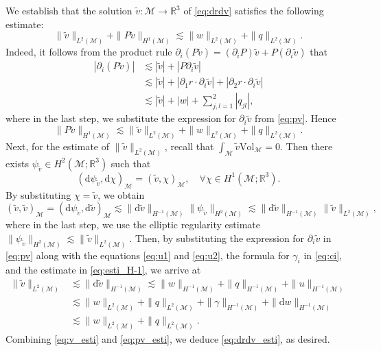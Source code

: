 \documentclass[11pt,a4paper,oneside,reqno]{amsart}
\theoremstyle{definition}
\theoremstyle{plain}
\numberwithin{theorem}{section}
\numberwithin{proposition}{section}
\numberwithin{lemma}{section}
\numberwithin{equation}{section}
\newcommand{\Man}{\mathcal{M}}
\newcommand{\Vol}{\mathrm{Vol}}
\begin{document}
We establish that the solution $\tilde{v} : \Man \rightarrow \mathbb{R}^3$ of \eqref{eq:drdv} 
satisfies the following estimate:
\begin{equation}\label{eq:drdv_esti}
\|\tilde{v}\|_{L^2(\Man)} + \|P\tilde{v}\|_{H^1(\Man)}
\lesssim \|w\|_{L^2(\Man)} + \|q\|_{L^2(\Man)}.
\end{equation}
Indeed, it follows from the product rule 
$\partial_i(P \tilde v) = (\partial_i P) \tilde  v + P (\partial_i\tilde  v)$ that 
\[ \begin{aligned}
    | \partial_i(P \tilde v) | &\lesssim |\tilde v| + |P \partial_i \tilde v| \\ 
    & \lesssim  |\tilde v| + |\partial_1 r \cdot \partial_i \tilde v|
    + |\partial_2 r \cdot \partial_i \tilde v| \\ 
    & \lesssim  |\tilde v| + |w| + \sum_{j,l = 1}^2 |q_{jl}|, 
\end{aligned} \]
where in the last step, we substitute the expression for $\partial_i \tilde v$ from \eqref{eq:pv}. Hence 
\begin{equation}\label{eq:pv_esti} 
\|P \tilde  v\|_{H^1(\Man)} \lesssim 
\| \tilde  v \|_{L^2(\Man)} + \| w \|_{L^2(\Man)} + \|q\|_{L^2(\Man)}.
\end{equation} 
Next, for the estimate of $\|\tilde v\|_{L^2(\Man)}$, recall that $\int_{\Man} \tilde  v \Vol_{\Man} = 0$. Then there exists $\psi_{\tilde v} \in H^2(\Man; \mathbb{R}^3)$ such that 
\[ (\mathrm{d} \psi_{\tilde v}, \mathrm{d} \chi)_{\Man} = (\tilde v, \chi)_\Man, \quad \forall \chi \in H^1(\Man; \mathbb{R}^3). \]
By substituting $\chi = \tilde  v$, we obtain 
\[ (\tilde v, \tilde v)_{\Man} = (\mathrm{d} \psi_{\tilde v}, \mathrm{d} \tilde v)_{\Man}
\lesssim \| \mathrm{d} \tilde v \|_{H^{-1}(\Man)} \|\psi_{\tilde v}\|_{H^2(\Man)}
\lesssim \| \mathrm{d} \tilde v \|_{H^{-1}(\Man)} \| \tilde v \|_{L^2(\Man)}, 
\]
where in the last step, we use the elliptic regularity estimate $ \|\psi_{\tilde v}\|_{H^2(\Man)} \lesssim \| \tilde v \|_{L^2(\Man)}$. 
Then, by substituting the expression for \( \partial_i \tilde v \) in \eqref{eq:pv} along with the equations \eqref{eq:u1} and \eqref{eq:u2}, the formula for \( \gamma_i \) in \eqref{eq:ci}, and the estimate in \eqref{eq:esti_H-1}, we arrive at
\begin{equation}\label{eq:v_esti} 
\begin{aligned}
    \|\tilde  v\|_{L^2(\Man)} &\lesssim \| \mathrm{d} \tilde v \|_{H^{-1}(\Man)} 
\lesssim \| w \|_{H^{-1}(\Man)} + \|q\|_{H^{-1}(\Man)} + \|u\|_{H^{-1}(\Man)} \\ 
& \lesssim \| w \|_{L^2(\Man)} + \|q\|_{L^2(\Man)} + \| \gamma\|_{H^{-1}(\Man)} 
+ \|\mathrm{d} w\|_{H^{-1}(\Man)} \\ 
& \lesssim \| w \|_{L^2(\Man)} + \|q\|_{L^2(\Man)}.
\end{aligned}
\end{equation} 
Combining \eqref{eq:v_esti} and \eqref{eq:pv_esti}, we deduce \eqref{eq:drdv_esti}, as desired.
\end{document}
